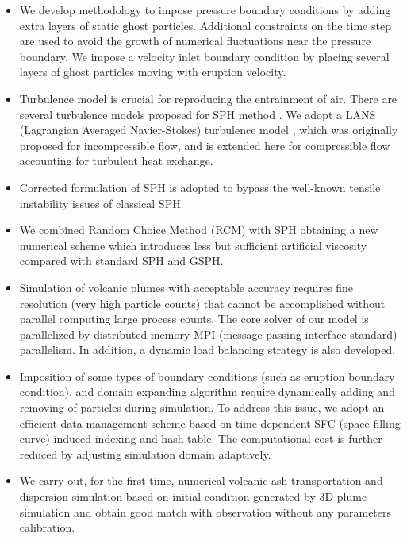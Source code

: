\begin{itemize}
\item We develop methodology to impose pressure boundary conditions by adding extra layers of static ghost particles. Additional constraints on the time step are used to avoid the growth of numerical fluctuations near the pressure boundary. We impose a velocity inlet boundary condition by placing several layers of ghost particles moving with eruption velocity. 
\item Turbulence model is crucial for reproducing the entrainment of air. There are several turbulence models proposed for SPH method \citep{issa2005numerical,violeau2007numerical}. We adopt a LANS (Lagrangian Averaged Navier-Stokes) turbulence model \citep{monaghan2011turbulence}, which was originally proposed for incompressible flow, and is extended here for compressible flow accounting for turbulent heat exchange. 
\item Corrected formulation of SPH \citep{chen1999improvement} is adopted to bypass the well-known tensile instability issues of classical SPH.
\item We combined Random Choice Method (RCM) with SPH obtaining a new numerical scheme which introduces less but sufficient artificial viscosity compared with standard SPH and GSPH.
\item Simulation of volcanic plumes with acceptable accuracy requires fine resolution (very high particle counts) that cannot be accomplished without parallel computing large process counts. The core solver of our model is parallelized by distributed memory MPI (message passing interface standard) parallelism. In addition, a dynamic load balancing strategy is also developed. 
\item Imposition of some types of boundary conditions (such as eruption boundary condition), and domain expanding algorithm require dynamically adding and removing of particles during simulation. To address this issue, we adopt an efficient data management scheme based on time dependent SFC (space filling curve) induced indexing and hash table. The computational cost is further reduced by adjusting simulation domain adaptively.
\item We carry out, for the first time, numerical volcanic ash transportation and dispersion simulation based on initial condition generated by 3D plume simulation and obtain good match with observation without any parameters calibration.
\end{itemize}


